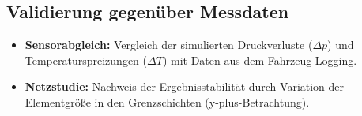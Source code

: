 \subsection{Validierung gegenüber Messdaten}
\begin{itemize}
    \item \textbf{Sensorabgleich:} Vergleich der simulierten Druckverluste ($\Delta p$) und Temperaturspreizungen ($\Delta T$) mit Daten aus dem Fahrzeug-Logging.
    \item \textbf{Netzstudie:} Nachweis der Ergebnisstabilität durch Variation der Elementgröße in den Grenzschichten (y-plus-Betrachtung).
\end{itemize}